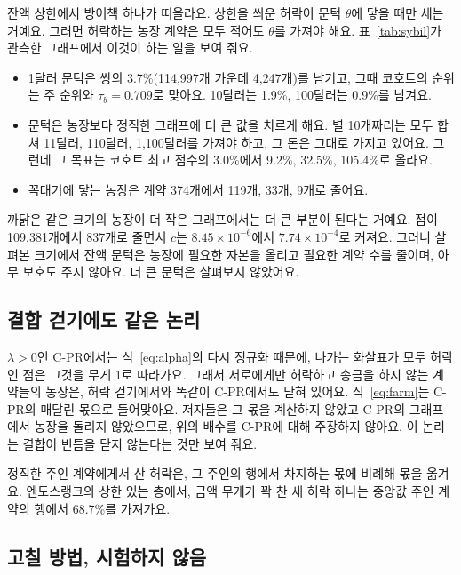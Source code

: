 잔액 상한에서 방어책 하나가 떠올라요. 상한을 씌운 허락이 문턱 $\theta$에 닿을 때만 세는 거예요. 그러면 허락하는 농장 계약은 모두 적어도 $\theta$를 가져야 해요. 표~\ref{tab:sybil}가 관측한 그래프에서 이것이 하는 일을 보여 줘요.
\begin{itemize}
\item 1달러 문턱은 쌍의 3.7\%(114,997개 가운데 4,247개)를 남기고, 그때 코호트의 순위는 주 순위와 $\tau_b=0.709$로 맞아요. 10달러는 1.9\%, 100달러는 0.9\%를 남겨요.
\item 문턱은 농장보다 정직한 그래프에 더 큰 값을 치르게 해요. 별 10개짜리는 모두 합쳐 11달러, 110달러, 1,100달러를 가져야 하고, 그 돈은 그대로 가지고 있어요. 그런데 그 목표는 코호트 최고 점수의 3.0\%에서 9.2\%, 32.5\%, 105.4\%로 올라요.
\item 꼭대기에 닿는 농장은 계약 374개에서 119개, 33개, 9개로 줄어요.
\end{itemize}
까닭은 같은 크기의 농장이 더 작은 그래프에서는 더 큰 부분이 된다는 거예요. 점이 109,381개에서 837개로 줄면서 $c$는 $8.45\times10^{-6}$에서 $7.74\times10^{-4}$로 커져요. 그러니 살펴본 크기에서 잔액 문턱은 농장에 필요한 자본을 올리고 필요한 계약 수를 줄이며, 아무 보호도 주지 않아요. 더 큰 문턱은 살펴보지 않았어요.

\subsection{결합 걷기에도 같은 논리}

$\lambda>0$인 C-PR에서는 식~\eqref{eq:alpha}의 다시 정규화 때문에, 나가는 화살표가 모두 허락인 점은 그것을 무게 1로 따라가요. 그래서 서로에게만 허락하고 송금을 하지 않는 계약들의 농장은, 허락 걷기에서와 똑같이 C-PR에서도 닫혀 있어요. 식~\eqref{eq:farm}는 C-PR의 매달린 몫으로 들어맞아요. 저자들은 그 몫을 계산하지 않았고 C-PR의 그래프에서 농장을 돌리지 않았으므로, 위의 배수를 C-PR에 대해 주장하지 않아요. 이 논리는 결합이 빈틈을 닫지 않는다는 것만 보여 줘요.

정직한 주인 계약에게서 산 허락은, 그 주인의 행에서 차지하는 몫에 비례해 몫을 옮겨요. 엔도스랭크의 상한 있는 층에서, 금액 무게가 꽉 찬 새 허락 하나는 중앙값 주인 계약의 행에서 68.7\%를 가져가요.

\subsection{고칠 방법, 시험하지 않음}

